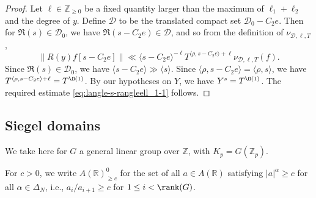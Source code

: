 \begin{proof}
  Let $\ell \in \mathbb{Z}_{\geq 0}$ be a fixed quantity larger than the maximum of $\ell_1 + \ell_2$ and the degree of $y$.  Define $\mathcal{D}$ to be the translated compact set $\mathcal{D}_0 - C_2 e$.  Then for $\Re(s) \in \mathcal{D}_0$, we have $\Re(s - C_2 e) \in \mathcal{D}$, and so from the definition of $\nu_{\mathcal{D},\ell,T}$,
  \begin{equation}\label{eq:ry-fs-c_2}
    \|R(y) f[s - C_2 e]\| \ll \langle s - C_2 e \rangle^{-\ell} T^{\langle \rho, s - C_2 e \rangle + \ell} \nu_{\mathcal{D},\ell,T}(f).
  \end{equation}
  Since $\Re(s) \in \mathcal{D}_0$, we have $\langle s - C_2 e \rangle \gg \langle s \rangle$.  Since $\langle \rho, s - C_2 e \rangle = \langle \rho, s \rangle$, we have $T^{\langle \rho, s - C_2 e \rangle + \ell} = T^{\O(1)}$.  By our hypotheses on $Y$, we have $Y^s = T^{\O(1)}$.   The required estimate \eqref{eq:langle-s-rangleell_1-1} follows.
\end{proof}



\subsection{Siegel domains}\label{sec:siegel-domains}
We take here for $G$ a general linear group over $\mathbb{Z}$, with $K_p = G(\mathbb{Z}_p)$.

For $c > 0$, we write $A(\mathbb{R})^0_{\geq c}$ for the set of all $a \in A(\mathbb{R})$ satisfying $|a|^{\alpha} \geq c$ for all $\alpha \in \Delta_N$, i.e., $a_i/a_{i+1} \geq c$ for $1 \leq i < \rank(G)$.

